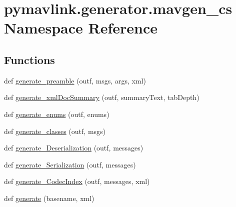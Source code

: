 \hypertarget{namespacepymavlink_1_1generator_1_1mavgen__cs}{}\section{pymavlink.\+generator.\+mavgen\+\_\+cs Namespace Reference}
\label{namespacepymavlink_1_1generator_1_1mavgen__cs}
\subsection*{Functions}
\begin{DoxyCompactItemize}
\item 
def \mbox{\hyperlink{namespacepymavlink_1_1generator_1_1mavgen__cs_a92544b954c0e791aafb1d03d768e0c13}{generate\+\_\+preamble}} (outf, msgs, args, xml)
\item 
def \mbox{\hyperlink{namespacepymavlink_1_1generator_1_1mavgen__cs_a9915c2abe90b770671bcb76ff7752a9a}{generate\+\_\+xml\+Doc\+Summary}} (outf, summary\+Text, tab\+Depth)
\item 
def \mbox{\hyperlink{namespacepymavlink_1_1generator_1_1mavgen__cs_a5ed1c57295dc34129fd7f4d80f2a8b25}{generate\+\_\+enums}} (outf, enums)
\item 
def \mbox{\hyperlink{namespacepymavlink_1_1generator_1_1mavgen__cs_a07bde4c2a35f369eeeda973364b5ef19}{generate\+\_\+classes}} (outf, msgs)
\item 
def \mbox{\hyperlink{namespacepymavlink_1_1generator_1_1mavgen__cs_a85f6d78f3a8f11400ba3d9be4e4ce405}{generate\+\_\+\+Deserialization}} (outf, messages)
\item 
def \mbox{\hyperlink{namespacepymavlink_1_1generator_1_1mavgen__cs_a1b4c53af7bc25e5cb3f2a3d2e67deeee}{generate\+\_\+\+Serialization}} (outf, messages)
\item 
def \mbox{\hyperlink{namespacepymavlink_1_1generator_1_1mavgen__cs_a0786f1048124c0599ae8ddf33077a201}{generate\+\_\+\+Codec\+Index}} (outf, messages, xml)
\item 
def \mbox{\hyperlink{namespacepymavlink_1_1generator_1_1mavgen__cs_a401ce8f84466bcf2b9247fab7f057fd2}{generate}} (basename, xml)
\end{DoxyCompactItemize}
